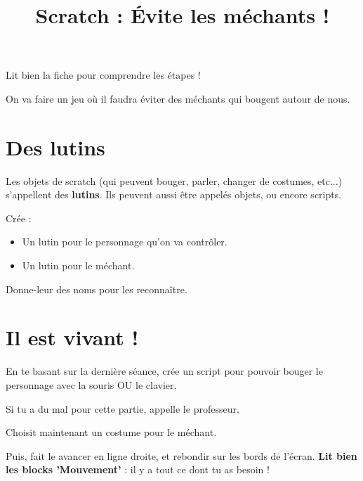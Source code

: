 \documentclass[a4paper,10pt]{article}
\title{Scratch : Évite les méchants !}
\date{}
\author{}
\begin{document}
\maketitle

\begin{attention}[frametitle={\huge ⚠}]
	Lit bien la fiche pour comprendre les étapes !
\end{attention}

\vspace{1em}

\begin{center}
	\large
	On va faire un jeu où il faudra éviter des méchants qui bougent autour de nous.
\end{center}

\section{Des lutins}

\begin{vocabulaire}[Lutins]
	Les objets de scratch (qui peuvent bouger, parler, changer de costumes, etc...) s'appellent des \textbf{lutins}. Ils peuvent aussi être appelés objets, ou encore scripts.
\end{vocabulaire}

Crée :
\begin{itemize}
	\item Un lutin pour le personnage qu'on va contrôler.
	\item Un lutin pour le méchant.
\end{itemize}

Donne-leur des noms pour les reconnaître.

\section{Il est vivant !}

En te basant sur la dernière séance, crée un script pour pouvoir bouger le personnage avec la souris OU le clavier.

\begin{attention}
	Si tu a du mal pour cette partie, appelle le professeur.
\end{attention}

Choisit maintenant un costume pour le méchant.

Puis, fait le avancer en ligne droite, et rebondir sur les bords de l'écran. \textbf{Lit bien les blocks 'Mouvement'} : il y a tout ce dont tu as besoin !
\end{document}
